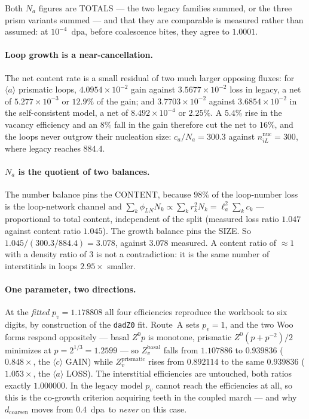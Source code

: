 \documentclass[11pt,a4paper]{article}
\newcommand{\code}[1]{\texttt{\small #1}}
\newcommand{\dpa}{\ensuremath{\mathrm{dpa}}}
\newcommand{\aloop}{\ensuremath{\langle a\rangle}}
\newcommand{\cloop}{\ensuremath{\langle c\rangle}}
\begin{document}
Both $N_a$ figures are TOTALS --- the two legacy families summed, or the three
prism variants summed --- and that they are comparable is measured rather than
assumed: at $10^{-4}$~\dpa, before coalescence bites, they agree to $1.0001$.

\paragraph{Loop growth is a near-cancellation.} The net content rate is a small
residual of two much larger opposing fluxes: for \aloop{} prismatic loops,
$4.0954\times10^{-2}$ gain against $3.5677\times10^{-2}$ loss in legacy, a net
of $5.277\times10^{-3}$ or $12.9\%$ of the gain; and $3.7703\times10^{-2}$
against $3.6854\times10^{-2}$ in the self-consistent model, a net of
$8.492\times10^{-4}$ or $2.25\%$. A $5.4\%$ rise in the vacancy efficiency and
an $8\%$ fall in the gain therefore cut the net to $16\%$, and the loops never
outgrow their nucleation size: $c_a/N_a = 300.3$ against
$n^{\mathrm{nuc}}_{iL} = 300$, where legacy reaches $884.4$.

\paragraph{$N_a$ is the quotient of two balances.} The number balance pins the
CONTENT, because $98\%$ of the loop-number loss is the loop-network channel and
$\sum_k \phi_{LN}N_k \propto \sum_k r_k^2 N_k = \ell_a^2\sum_k c_k$ ---
proportional to total content, independent of the split (measured loss ratio
$1.047$ against content ratio $1.045$). The growth balance pins the SIZE. So
$1.045/(300.3/884.4) = 3.078$, against $3.078$ measured. A content ratio of
$\approx 1$ with a density ratio of $3$ is not a contradiction: it is the same
number of interstitials in loops $2.95\times$ smaller.

\paragraph{One parameter, two directions.} At the \emph{fitted}
$p_v = 1.178808$ all four efficiencies reproduce the workbook to six digits, by
construction of the \code{dadZ0} fit. Route~A sets $p_v = 1$, and the two Woo
forms respond oppositely --- basal $Z^0p$ is monotone, prismatic
$Z^0(p+p^{-2})/2$ minimizes at $p = 2^{1/3} = 1.2599$ --- so
$Z^{\text{basal}}_v$ falls from $1.107886$ to $0.939836$ ($0.848\times$, the
\cloop{} GAIN) while $Z^{\text{prismatic}}_v$ rises from $0.892114$ to the same
$0.939836$ ($1.053\times$, the \aloop{} LOSS). The interstitial efficiencies are
untouched, both ratios exactly $1.000000$. In the legacy model $p_v$ cannot
reach the efficiencies at all, so this is the co-growth criterion acquiring
teeth in the coupled march --- and why $d_{\text{coarsen}}$ moves from
$0.4$~\dpa\ to \emph{never} on this case.
\end{document}
